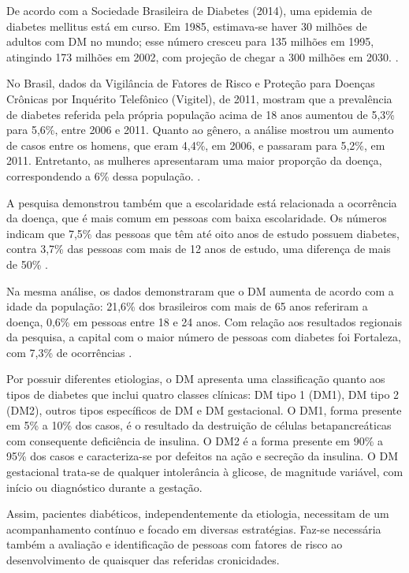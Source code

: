 De acordo com a Sociedade Brasileira de Diabetes (2014), uma epidemia de diabetes mellitus está em curso. Em 1985, estimava-se haver 30 milhões de adultos com DM no mundo; esse número cresceu para 135 milhões em 1995, atingindo 173 milhões em 2002, com projeção de chegar a 300 milhões em 2030. \cite{sarah2004global}.

No Brasil, dados da Vigilância de Fatores de Risco e Proteção para Doenças Crônicas por Inquérito Telefônico (Vigitel), de 2011, mostram que a prevalência de diabetes referida pela própria  população acima de 18 anos aumentou de 5,3\% para 5,6\%, entre 2006 e 2011. Quanto ao gênero, a análise mostrou um aumento de casos entre os homens, que eram 4,4\%, em 2006, e passaram para 5,2\%, em 2011. Entretanto, as mulheres apresentaram uma maior proporção da doença, correspondendo a 6\% dessa população. \cite{monteiro2007vigitel}.

A pesquisa demonstrou também que a escolaridade está relacionada a ocorrência da doença, que é mais comum em pessoas com baixa escolaridade. Os números indicam que 7,5\% das pessoas que têm até oito anos de estudo possuem diabetes, contra 3,7\% das pessoas com mais de 12 anos de estudo, uma diferença de mais de 50\% \cite{monteiro2007vigitel}.

Na mesma análise, os dados demonstraram que o DM aumenta de acordo com a idade da população: 21,6\% dos brasileiros com mais de 65 anos referiram a doença, 0,6\% em pessoas entre 18 e 24 anos. Com relação aos resultados regionais da pesquisa, a capital com o maior número de pessoas com diabetes foi Fortaleza, com 7,3\% de ocorrências \cite{monteiro2007vigitel}.

Por possuir diferentes etiologias, o DM apresenta uma classificação quanto aos tipos de diabetes que inclui quatro classes clínicas: DM tipo 1 (DM1), DM tipo 2 (DM2), outros tipos específicos de DM e DM gestacional. O DM1, forma presente em 5\% a 10\% dos casos, é o resultado da destruição de células betapancreáticas com consequente deficiência de insulina. O DM2 é a forma presente em 90\% a 95\% dos casos e caracteriza-se por defeitos na ação e secreção da insulina. O DM gestacional trata-se de qualquer intolerância à glicose, de magnitude variável, com início ou diagnóstico durante a gestação. \cite{sociedade2009diretrizes}

Assim, pacientes diabéticos, independentemente da etiologia, necessitam de um acompanhamento contínuo e focado em diversas estratégias. Faz-se necessária também a avaliação e identificação de pessoas com fatores de risco ao desenvolvimento de quaisquer das referidas cronicidades. 


